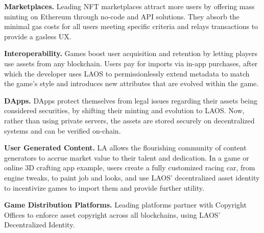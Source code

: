{\bf Marketplaces.} Leading NFT marketplaces attract more users by
offering mass minting on Ethereum through no-code and API solutions.
They absorb the minimal gas costs
for all users meeting specific criteria and relays transactions to provide a gasless UX.

{\bf Interoperability.} Games boost user acquisition and retention
by letting players use assets from any blockchain.
Users pay for imports via in-app purchases, after which
the developer uses LAOS to permissionlessly extend metadata to match the game's
style and introduces new attributes that are evolved within the game.

{\bf DApps.} DApps protect themselves from legal issues regarding
their assets being considered securities,
by shifting their minting and evolution to LAOS.
Now, rather than using private servers, the assets
are stored securely on decentralized systems and can be verified on-chain.

{\bf User Generated Content.} LA allows the flourishing community of content generators to 
accrue market value to their talent and dedication. In a game or online 3D crafting app example,
users create a fully customized racing car, from engine tweaks, to paint job and looks,
and use LAOS' decentralized asset identity to incentivize games to import them and 
provide further utility.

{\bf Game Distribution Platforms.} Leading platforms partner with Copyright Offices
to enforce asset copyright across all blockchains, using LAOS' Decentralized Identity.



